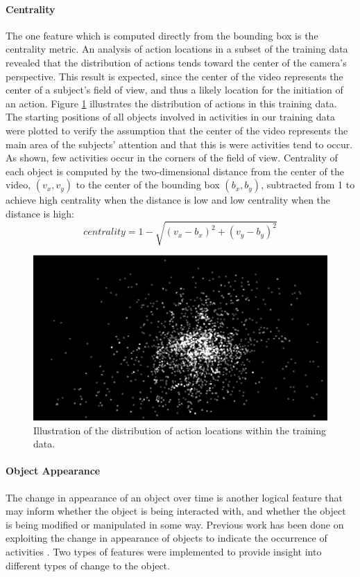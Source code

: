 \documentclass[12pt]{report}
\begin{document}
\paragraph{Centrality}
The one feature which is computed directly from the bounding box is the centrality metric. An analysis of action locations in a subset of the training data revealed that the distribution of actions tends toward the center of the camera's perspective. This result is expected, since the center of the video represents the center of a subject's field of view, and thus a likely location for the initiation of an action. Figure \ref{action_locations} illustrates the distribution of actions in this training data. The starting positions of all objects involved in activities in our training data were plotted to verify the assumption that the center of the video represents the main area of the subjects' attention and that this is were activities tend to occur. As shown, few activities occur in the corners of the field of view. Centrality of each object is computed by the two-dimensional distance from the center of the video, $(v_x, v_y)$ to the center of the bounding box $(b_x, b_y)$, subtracted from 1 to achieve high centrality when the distance is low and low centrality when the distance is high: \\
\begin{equation}
    centrality = 1 - \sqrt{(v_x - b_x)^2 + (v_y - b_y)^2}
\end{equation}

\begin{figure}[t]
\centerline{\includegraphics[width=.9\linewidth]{figure/action_locations.png}}
\caption{Illustration of the distribution of action locations within the training data.}
\label{action_locations}
\end{figure}

\paragraph{Object Appearance}
The change in appearance of an object over time is another logical feature that may inform whether the object is being interacted with, and whether the object is being modified or manipulated in some way. Previous work has been done on exploiting the change in appearance of objects to indicate the occurrence of activities \cite{Pirsiavash2012}. Two types of features were implemented to provide insight into different types of change to the object. 
\end{document}
